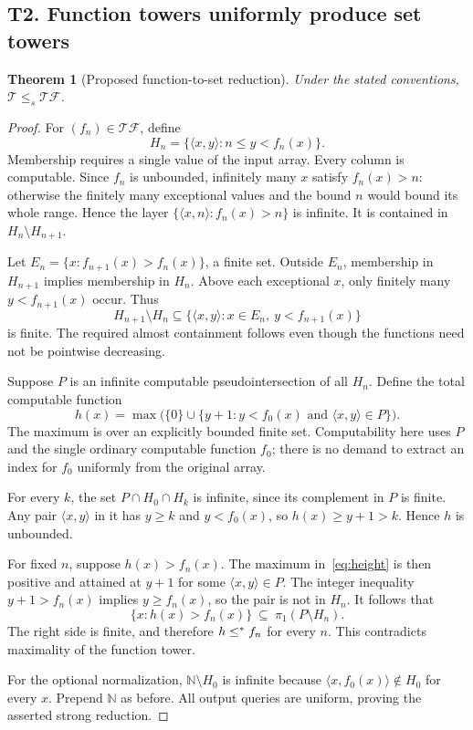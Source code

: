 \documentclass[11pt,a4paper]{article}
\newcommand{\N}{\mathbb N}
\newcommand{\T}{\mathcal T}\newcommand{\TF}{\mathcal{TF}}\newcommand{\Tw}{\mathcal T^{-}}
\newcommand{\pair}[2]{\langle#1,#2\rangle}
\newtheorem{theorem}{Theorem}[section]
\theoremstyle{definition}\newtheorem{definition}[theorem]{Definition}
\theoremstyle{remark}\newtheorem{remark}[theorem]{Remark}
\begin{document}
\subsection{T2. Function towers uniformly produce set towers}\label{entry:T2}
\begin{theorem}[Proposed function-to-set reduction]\label{thm:function}
Under the stated conventions, $\T\leq_s\TF$.
\end{theorem}
\begin{proof}
For $(f_n)\in\TF$, define
\begin{equation}
 H_n=\{\pair{x}{y}: n\leq y<f_n(x)\}.
 \label{eq:functionpad}
\end{equation}
Membership requires a single value of the input array. Every column is
computable. Since $f_n$ is unbounded, infinitely many $x$ satisfy $f_n(x)>n$:
otherwise the finitely many exceptional values and the bound $n$ would bound
its whole range. Hence the layer $\{\pair{x}{n}:f_n(x)>n\}$ is infinite.
It is contained in $H_n\setminus H_{n+1}$.

Let $E_n=\{x:f_{n+1}(x)>f_n(x)\}$, a finite set. Outside $E_n$, membership
in $H_{n+1}$ implies membership in $H_n$. Above each exceptional $x$, only
finitely many $y<f_{n+1}(x)$ occur. Thus
\[
 H_{n+1}\setminus H_n
 \subseteq\{\pair{x}{y}:x\in E_n,\ y<f_{n+1}(x)\}
\]
is finite. The required almost containment follows even though the functions
need not be pointwise decreasing.

Suppose $P$ is an infinite computable pseudointersection of all $H_n$.
Define the total computable function
\begin{equation}
 h(x)=\max\bigl(\{0\}\cup
       \{y+1:y<f_0(x)\text{ and }\pair{x}{y}\in P\}\bigr).
 \label{eq:height}
\end{equation}
The maximum is over an explicitly bounded finite set. Computability here uses
$P$ and the single ordinary computable function $f_0$; there is no demand to
extract an index for $f_0$ uniformly from the original array.

For every $k$, the set $P\cap H_0\cap H_k$ is infinite, since its complement
in $P$ is finite. Any pair $\pair{x}{y}$ in it has $y\geq k$ and
$y<f_0(x)$, so $h(x)\geq y+1>k$. Hence $h$ is unbounded.

For fixed $n$, suppose $h(x)>f_n(x)$. The maximum in~\eqref{eq:height} is
then positive and attained at $y+1$ for some $\pair{x}{y}\in P$.
The integer inequality $y+1>f_n(x)$ implies $y\geq f_n(x)$, so the pair is
not in $H_n$. It follows that
\begin{equation}
 \{x:h(x)>f_n(x)\}\ \subseteq\ \pi_1(P\setminus H_n).
 \label{eq:height-error}
\end{equation}
The right side is finite, and therefore $h\leq^{*} f_n$ for every $n$.
This contradicts maximality of the function tower.

For the optional normalization, $\N\setminus H_0$ is infinite because
$\pair{x}{f_0(x)}\notin H_0$ for every $x$. Prepend $\N$ as before.
All output queries are uniform, proving the asserted strong reduction.
\end{proof}
\end{document}
